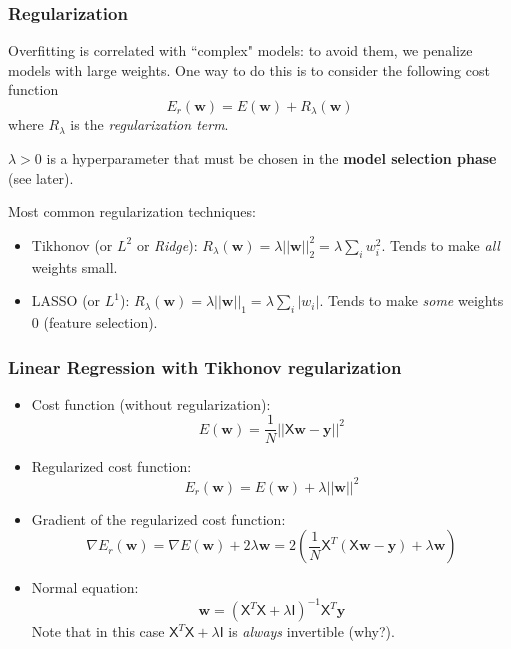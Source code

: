 \documentclass{beamer}
\begin{document}
	
	\begin{frame}
		\frametitle{Regularization}
		
		Overfitting is correlated with ``complex" models: to avoid them, we penalize models with large weights. One way to do this is to consider the following cost function
		\begin{equation*}
			E_{r}(\bm{w}) = E(\bm{w}) + R_{\lambda}(\bm{w})
		\end{equation*}
		where $R_{\lambda}$ is the \textsl{regularization term}.
		
		$\lambda > 0$ is a hyperparameter that must be chosen in the \textbf{model selection phase} (see later).
		
		\vspace{5mm}
		
		Most common regularization techniques:
		\begin{itemize}
			\item Tikhonov (or $L^2$ or \textit{Ridge}): $R_{\lambda}(\bm{w}) = \lambda ||\bm{w}||^2_2 = \lambda \sum_i w_i^2$. Tends to make \textit{all} weights small.
			\item LASSO (or $L^1$): $R_{\lambda}(\bm{w}) = \lambda ||\bm{w}||_1 = \lambda \sum_i |w_i|$. Tends to make \textit{some} weights $0$ (feature selection).
		\end{itemize}
	\end{frame}
	
	\begin{frame}
		\frametitle{Linear Regression with Tikhonov regularization}
		\begin{itemize}
			\item Cost function (without regularization):
			\begin{equation*}
				E(\bm{w}) = \frac{1}{N} ||\mathsf{X} \bm{w} - \bm{y}||^2
			\end{equation*}
			\item Regularized cost function:
			\begin{equation*}
				E_{r}(\bm{w}) = E(\bm{w}) + \lambda ||\bm{w}||^2
			\end{equation*}
			\item Gradient of the regularized cost function:
			\begin{equation*}
				\nabla E_r(\bm{w}) = \nabla E(\bm{w}) + 2 \lambda \bm{w} = 2\left(\frac{1}{N}\mathsf{X}^T(\mathsf{X}\bm{w} - \bm{y}) + \lambda \bm{w}\right)
			\end{equation*}
			\item Normal equation:
			\begin{equation*}
				\bm{w} = (\mathsf{X}^T\mathsf{X} + \lambda \mathsf{I})^{-1}\mathsf{X}^T\bm{y}
			\end{equation*}
			Note that in this case $\mathsf{X}^T\mathsf{X} + \lambda \mathsf{I}$ is \textsl{always} invertible (why?).
		\end{itemize}
		
		
	\end{frame}
	
\end{document}
